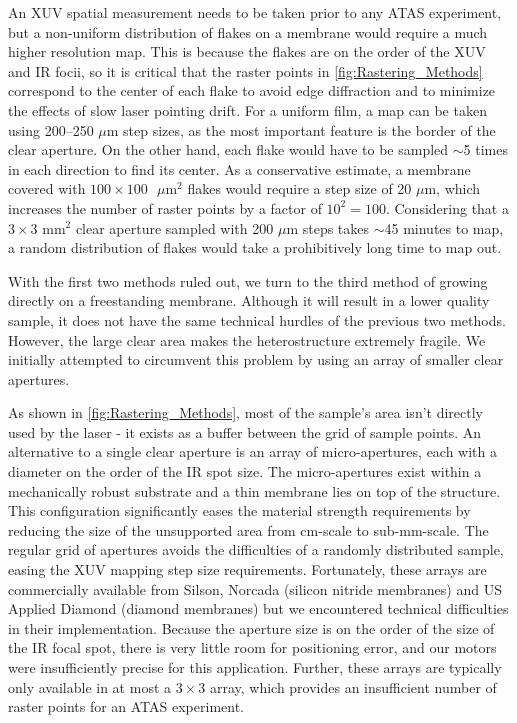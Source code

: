 An XUV spatial measurement needs to be taken prior to any ATAS experiment, but a non-uniform distribution of flakes on a membrane would require a much higher resolution map. This is because the flakes are on the order of the XUV and IR focii, so it is critical that the raster points in \cref{fig:Rastering_Methods} correspond to the center of each flake to avoid edge diffraction and to minimize the effects of slow laser pointing drift. For a uniform film, a map can be taken using 200--250 $\mu$m step sizes, as the most important feature is the border of the clear aperture. On the other hand, each flake would have to be sampled $\sim$5 times in each direction to find its center. As a conservative estimate, a membrane covered with $100 \times 100\text{ }\mu$m$^2$ flakes would require a step size of 20 $\mu$m, which increases the number of raster points by a factor of $10^2 = 100$. Considering that a $3 \times 3 \text{ mm}^2$ clear aperture sampled with 200 $\mu$m steps takes $\sim$45 minutes to map, a random distribution of flakes would take a prohibitively long time to map out.

With the first two methods ruled out, we turn to the third method of growing directly on a freestanding membrane. Although it will result in a lower quality sample, it does not have the same technical hurdles of the previous two methods. However, the large clear area makes the heterostructure extremely fragile. We initially attempted to circumvent this problem by using an array of smaller clear apertures.

As shown in \cref{fig:Rastering_Methods}, most of the sample's area isn't directly used by the laser - it exists as a buffer between the grid of sample points. An alternative to a single clear aperture is an array of micro-apertures, each with a diameter on the order of the IR spot size. The micro-apertures exist within a mechanically robust substrate and a thin membrane lies on top of the structure. This configuration significantly eases the material strength requirements by reducing the size of the unsupported area from cm-scale to sub-mm-scale. The regular grid of apertures avoids the difficulties of a randomly distributed sample, easing the XUV mapping step size requirements. Fortunately, these arrays are commercially available from Silson, Norcada (silicon nitride membranes) and US Applied Diamond (diamond membranes) but we encountered technical difficulties in their implementation. Because the aperture size is on the order of the size of the IR focal spot, there is very little room for positioning error, and our motors were insufficiently precise for this application. Further, these arrays are typically only available in at most a $3\times3$ array, which provides an insufficient number of raster points for an ATAS experiment.

